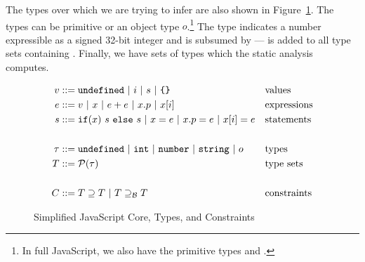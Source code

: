The types over which we are trying to infer are also shown in
Figure~\ref{fig:js-core}. The types can be primitive or an object type
$o$.\footnote{In full JavaScript, we also have the primitive types 
  and .} The  type indicates a number expressible as a
signed 32-bit integer and is subsumed by  ---  is
added to all type sets containing . Finally, we have sets of
types which the static analysis computes.

\newcommand{\barrier}{\supseteq_\mathcal{B}}

\begin{figure}
\begin{align*}
v & ::= \code{undefined}\ |\ i\ |\ s\ |\ \text{\code{\{\}}} && \text{values}\\
e & ::= v\ |\ x\ |\ e + e\ |\ x.p\ |\ x[i]\ && \text{expressions}\\
s & ::= \code{if}(x)\ s\ \code{else}\ s\ |\ x = e\ |\ x.p = e\ |\ x[i] = e && \text{statements}\\
\\
\tau & ::= \code{undefined}\ |\ \code{int}\ |\ \code{number}\ |\ \code{string}\ |\ o && \text{types}\\
T & ::= \mathcal{P}(\tau) && \text{type sets}\\
\\
C & ::= T \supseteq T\ |\ T \barrier T && \text{constraints}
\end{align*}
\caption{Simplified JavaScript Core, Types, and Constraints}
\label{fig:js-core}
\end{figure}

